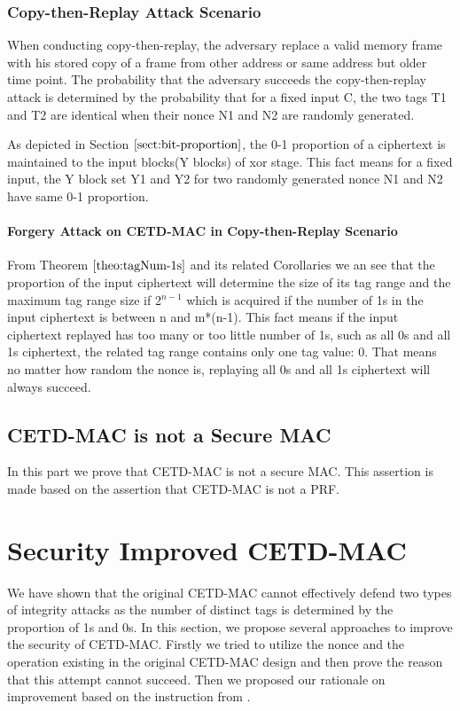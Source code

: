\subsubsection{Copy-then-Replay Attack Scenario}

When conducting copy-then-replay, the adversary replace a valid memory frame with his stored copy of a frame from other address or same address but older time point. The probability that the adversary succeeds the copy-then-replay attack is determined by the probability that for a fixed input C, the two tags T1 and T2 are identical when their nonce N1 and N2 are randomly generated.

As depicted in Section $\ref{sect:bit-proportion}$, the 0-1 proportion of a ciphertext is maintained to the input blocks(Y blocks) of xor stage. This fact means for a fixed input, the Y block set Y1 and Y2 for two randomly generated nonce N1 and N2 have same 0-1 proportion.  
\paragraph{Forgery Attack on CETD-MAC in Copy-then-Replay Scenario}
From Theorem $\ref{theo:tagNum-1s}$ and its related Corollaries we an see that the proportion of the input ciphertext will determine the size of its tag range and the maximum tag range size if 2$^{n-1}$ which is acquired if the number of 1s in the input ciphertext is between n and m*(n-1).
This fact means if the input ciphertext replayed has too many or too little number of 1s, such as all 0s and all 1s ciphertext, the related tag range contains only one tag value: 0. That means no matter how random the nonce is, replaying all 0s and all 1s ciphertext will always succeed.

\subsection{CETD-MAC is not a Secure MAC}
In this part we prove that CETD-MAC is not a secure MAC. This assertion is made
based on the assertion that CETD-MAC is not a PRF.

\section{Security Improved CETD-MAC}
We have shown that the original CETD-MAC cannot effectively defend two types of integrity attacks as the number of distinct tags is determined by the proportion of 1s and 0s. In this section, we propose several approaches to improve the security of CETD-MAC. Firstly we tried to utilize the nonce and the operation existing in the original CETD-MAC design and then prove the reason that this attempt cannot succeed. Then we proposed our rationale on improvement based on the instruction from \cite{}.  

